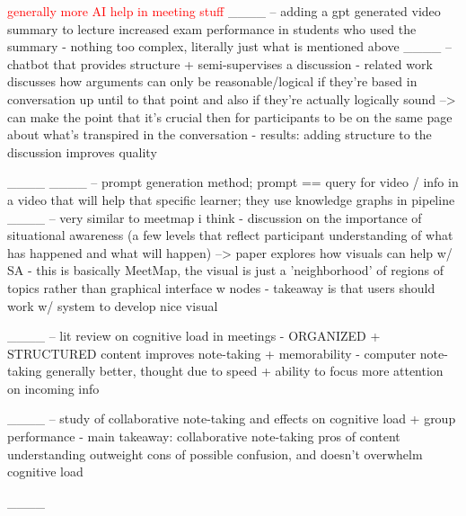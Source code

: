 \textcolor{red}{generally more AI help in meeting stuff}
____ -- adding a gpt generated video summary to lecture increased exam performance in students who used the summary
    - nothing too complex, literally just what is mentioned above
____ -- chatbot that provides structure + semi-supervises a discussion
    - related work discusses how arguments can only be reasonable/logical if they're based in conversation up until to that point and also if they're actually logically sound --> can make the point that it's crucial then for participants to be on the same page about what's transpired in the conversation
    - results: adding structure to the discussion improves quality 



____
____ -- prompt generation method; prompt == query for video / info in a video that will help that specific learner; they use knowledge graphs in pipeline
____ -- very similar to meetmap i think
    - discussion on the importance of situational awareness (a few levels that reflect participant understanding of what has happened and what will happen) --> paper explores how visuals can help w/ SA 
    - this is basically MeetMap, the visual is just a 'neighborhood' of regions of topics rather than graphical interface w nodes
    - takeaway is that users should work w/ system to develop nice visual 



____ -- lit review on cognitive load in meetings
    - ORGANIZED + STRUCTURED content improves note-taking + memorability
    - computer note-taking generally better, thought due to speed + ability to focus more attention on incoming info

____ -- study of collaborative note-taking and effects on cognitive load + group performance
    - main takeaway: collaborative note-taking pros of content understanding outweight cons of possible confusion, and doesn't overwhelm cognitive load

____